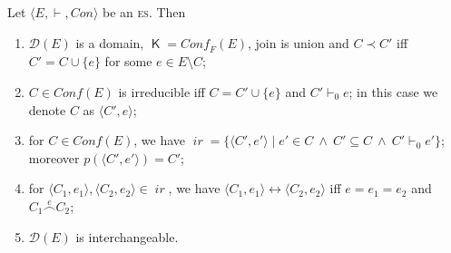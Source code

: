 \documentclass[conference]{IEEEtran}
\newcommand{\wi}{{interchangeable}}
\newcommand{\compact}[1]{\ensuremath{\mathop{\mathsf{K}({#1})}}}
\newcommand{\ir}[1]{\ensuremath{\mathop{\mathit{ir}({#1})}}}
\newcommand{\esabbr}{\textsc{es}}
\newcommand{\pred}[1]{\ensuremath{\mathit{p}({#1})}}
\newcommand{\esir}[2]{\ensuremath{\langle{#1}, {#2}\rangle}}
\newcommand{\conf}[1]{\ensuremath{\mathit{Conf}({#1})}}
\newcommand{\conff}[1]{\ensuremath{\mathit{Conf_F}({#1})}}
\newcommand{\conn}[1]{\ensuremath{\stackrel{#1}{\frown}}}
\newcommand{\zdom}[0]{\ensuremath{\mathcal{D}}}
\newcommand{\dom}[1]{\ensuremath{\zdom({#1})}}
\begin{document}
\begin{lemma}
  \label{le:es-to-fusion-domain}
  Let $\langle E, \vdash, Con \rangle$ be an {\esabbr}.
  Then
  \begin{enumerate}

  \item 
    \label{le:es-to-fusion-domain:1}
    $\dom{{E}}$ is a domain,
    $\compact{\dom{{E}}} = \conff{{E}}$, join is union and
    $C \prec C'$ iff {$C' = C \cup \{ e \}$
    for some $e \in E \setminus C$};

  \item
    \label{le:es-to-fusion-domain:2}
    $C \in \conf{{E}}$ is irreducible iff $C = C' \cup \{ e \}$ and
    $C' \vdash_0 e$; in this case we denote $C$ as $\esir{C'}{e}$;

  \item 
    \label{le:es-to-fusion-domain:3}
    for $C \in \conf{{E}}$, we have
    $\ir{C} = \{ \esir{C'}{e'} \mid e' \in C\ \land\ C' \subseteq C\
    \land\ C' \vdash_0 e' \}$; moreover $\pred{\esir{C'}{e'}} = C'$;

  \item 
    \label{le:es-to-fusion-domain:4}
%
    for $\esir{C_1}{e_1}, \esir{C_2}{e_2} \in \ir{\dom{{E}}}$, we have
    $\esir{C_1}{e_1} \leftrightarrow \esir{C_2}{e_2}$ iff $e = e_1 = e_2$
    and $C_1 \conn{e} C_2$;
    
  \item
    \label{le:es-to-fusion-domain:5}
    $\dom{E}$ is {\wi}.

  \end{enumerate}
\end{lemma}
\end{document}

